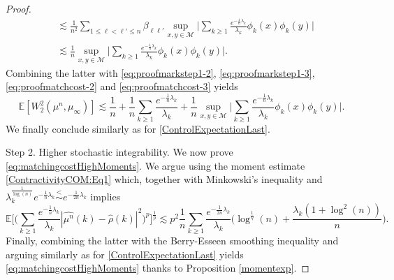 \documentclass[11pt,a4paper,oneside]{amsart}
\numberwithin{equation}{section}
\newcommand{\lessim}{\stackrel{<}{\sim}}
\newcommand{\dd}{\mathrm{d}}
\newcommand{\m}{\mathrm{m}}
\begin{document}
\begin{proof}
\begin{align*}
& \lesssim \frac1{n^2}\sum_{1\le \ell < \ell' \le n} \beta_{\ell \ell'} \sup_{x,y \in \mathcal{M}} \bigg\lvert \sum_{k\ge1} \frac{e^{-\frac1n \lambda_k}}{\lambda_k} \phi_k(x)\phi_k(y)\bigg\rvert \\
&\lesssim \frac1n \sup_{x,y \in \mathcal{M}} \bigg\lvert \sum_{k\ge1} \frac{e^{-\frac1n \lambda_k}}{\lambda_k} \phi_k(x)\phi_k(y)\bigg\rvert.
\end{align*}
%
Combining the latter with \eqref{eq:proofmarkstep1-2}, \eqref{eq:proofmarkstep1-3}, \eqref{eq:proofmatchcost-2} and \eqref{eq:proofmatchcost-3} yields 
%
\begin{equation}\label{eq:proofmarkstep1-6}
\mathbb{E}[W_2^2(\mu^n, \mu_\infty)] \lesssim \frac1n + \frac1n \sum_{k\ge1} \frac{e^{-\frac1n\lambda_k}}{\lambda_k} + \frac1n \sup_{x,y \in \mathcal{M}} \bigg\lvert \sum_{k\ge1} \frac{e^{-\frac1n \lambda_k}}{\lambda_k} \phi_k(x)\phi_k(y)\bigg\rvert.
\end{equation}
%
We finally conclude similarly as for \eqref{ControlExpectationLast}.
%
\medskip
%

{\sc Step 2. Higher stochastic integrability. }We now prove \eqref{eq:matchingcostHighMoments}. We argue using the moment estimate \eqref{ContractivityCOM:Eq1} which, together with Minkowski's inequality and $\lambda_k^\frac1{\log(n)} e^{-\frac1n \lambda_k} \lessim e^{-\frac1{2n}\lambda_k}$ implies
\[
\mathbb{E}\bigg[\bigg(\sum_{k\ge1} \frac{e^{-\frac1n \lambda_k}}{\lambda_k}|\widehat{\mu^n}(k)-\widehat{\rho}(k)|^2\bigg)^p\bigg]^\frac1p \lesssim p^2 \frac1n \sum_{k\ge 1} \frac{e^{-\frac1{2n} \lambda_k}}{\lambda_k}\bigg( \log^\frac1\eta(n) + \frac{\lambda_k(1+\log^2(n))}{n}  \bigg).
\]
Finally, combining the latter with the Berry-Esseen smoothing inequality \cite[Theorem 5]{borda2021empirical} and arguing similarly as for \eqref{ControlExpectationLast} yields \eqref{eq:matchingcostHighMoments} thanks to Proposition \ref{momentexp}.
\end{proof}
\end{document}
